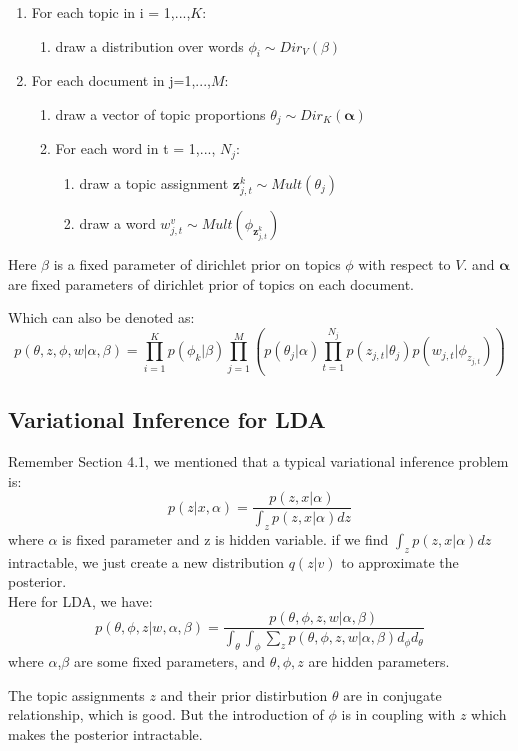 \documentclass{article}
\begin{document}
\begin{enumerate}
\item 
{ For each topic in i = 1,...,$K$: 
\begin{enumerate}
\item draw a distribution over words $\phi_{i} \sim Dir_{V}(\beta)$
\end{enumerate}
}
\item
{ For each document in j=1,...,$M$:
\begin{enumerate}
\item draw a vector of topic proportions $\theta_{j} \sim Dir_{K}(\bm{\alpha})$
\item For each word in t = 1,..., $N_{j}$:
{
\begin{enumerate}
\item  draw a topic assignment $\bm{z}_{j,t}^{k} \sim Mult(\theta_{j})$
\item draw a word $w_{j,t}^{v} \sim Mult(\phi_{\bm{z}_{j,t}^{k}})$
\end{enumerate}
}
\end{enumerate}
}
\end{enumerate}
Here $\beta$ is a fixed parameter of dirichlet prior on topics $\phi$ with respect to $V$. and $\bm{\alpha}$ are fixed parameters of dirichlet prior of topics on each document.

Which can also be denoted as:
$$p(\theta,z,\phi,w|\alpha,\beta)=\prod_{i=1}^{K} p(\phi_{k}|\beta)\prod_{j=1}^{M}\left( p(\theta_{j}|\alpha)\prod_{t=1}^{N_{j}} p(z_{j,t}|\theta_{j})p(w_{j,t}|\phi_{z_{j,t}})\right)$$

\subsection{Variational Inference for LDA}
Remember Section 4.1, we mentioned that a typical variational inference problem is: 
$$p(z|x,\alpha)=\frac{p(z,x|\alpha)}{\int_z p(z,x|\alpha)dz}$$
where $\alpha$ is fixed parameter and z is hidden variable. if we find $\int_z p(z,x|\alpha)dz$ intractable, we just create a new distribution $q(z|v)$ to approximate the posterior.\\
\noindent
Here for LDA, we have:
$$p(\theta,\phi,z|w,\alpha,\beta) = \frac{p(\theta,\phi,z,w|\alpha,\beta)}{\int_{\theta} \int_{\phi} \sum_{z} p(\theta,\phi,z,w|\alpha,\beta)d_{\phi}d_{\theta} }$$
where $\alpha$,$\beta$ are some fixed parameters, and $\theta,\phi,z$ are hidden parameters. 

The topic assignments $z$ and their prior distirbution $\theta$ are in conjugate relationship, which is good. But the introduction of $\phi$ is in coupling with $z$ which makes the posterior intractable.
\end{document}
